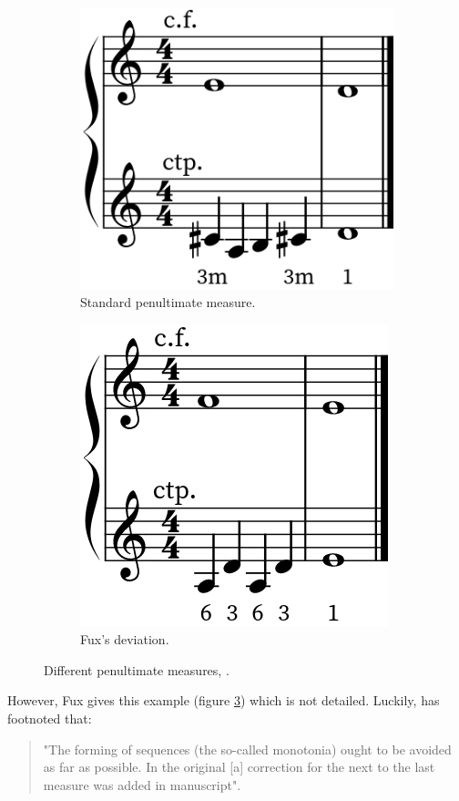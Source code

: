 \begin{enumerate}[wide, label=\bfseries 3.H\arabic*]
    \begin{figure}[h]
        \centering
        \begin{subfigure}{.5\textwidth}
            \centering
            \includegraphics[height=\fh]{Images/penult_3rd.png}
            \caption{Standard penultimate measure.}
            \label{fig:penult3sp}
        \end{subfigure}%
        \begin{subfigure}{.5\textwidth}
            \centering
            \includegraphics[height=\fh]{Images/penult_deviation_3rd.png}
            \caption{Fux's deviation.}
            \label{fig:penultdeviation}
        \end{subfigure}
        \caption{Different penultimate measures, .}
    \end{figure}

    However, Fux gives this example (figure \ref{fig:penultdeviation}) which is not detailed. Luckily, \citeauthor{GaPEng} has footnoted that:
    \begin{quotation}
        "The forming of sequences (the so-called monotonia) ought to be avoided as far as possible. In the original [a] correction for the next to the last measure was added in manuscript".
        \textcite[p.54]{GaPEng}
    \end{quotation}


\end{enumerate}
